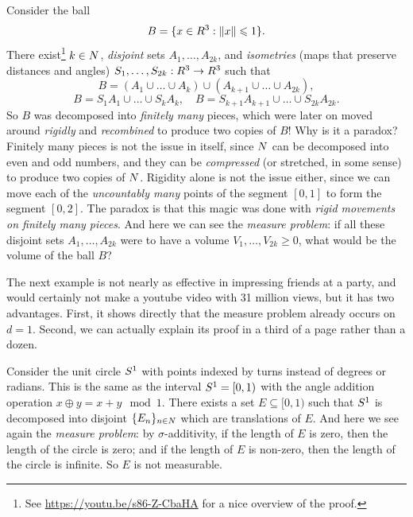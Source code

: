 \documentclass[
]{book}
\theoremstyle{definition}
\theoremstyle{remark}
\newenvironment{example}{\pushQED{\qed}\renewcommand{\qedsymbol}{\scriptsize$\triangle$}\examplex}{\popQED\endexamplex}
\let\mathbb\relax %
\newcommand{\N}{\mathbb{N}}
\newcommand{\R}{\mathbb{R}}
\newcommand{\SSS}{\mathbb{S}}
\renewcommand*{\leq}{\leqslant}
\renewcommand*{\geq}{\geqslant}
\begin{document}
\begin{example}[Banach-Tarski paradox]
\protect\hypertarget{exm:banachtarski}{}\label{exm:banachtarski}Consider the ball \[B = \{x \in \R^3 : \|x\| \leq 1 \} .\] There exist\footnote{See \url{https://youtu.be/s86-Z-CbaHA} for a nice overview of the
  proof.}
\(k\in\N\), \emph{disjoint} sets \(A_1,\dots,A_{2k}\), and \emph{isometries} (maps
that preserve distances and angles) \(S_1,\dots,S_{2k}:\R^3\to\R^3\) such
that
\[B = (A_1 \cup \dots \cup A_k) \cup (A_{k+1} \cup \dots \cup A_{2k}),\]
\[B = S_1 A_1 \cup \dots \cup S_{k} A_{k}, \quad B = S_{k+1} A_{k+1} \cup \dots \cup S_{2k} A_{2k}.\]
So \(B\) was decomposed into \emph{finitely many} pieces, which were later on
moved around \emph{rigidly} and \emph{recombined} to produce two copies of \(B\)!
Why is it a paradox? Finitely many pieces is not the issue in itself,
since \(\N\) can be decomposed into even and odd numbers, and they can be
\emph{compressed} (or stretched, in some sense) to produce two copies of
\(\N\). Rigidity alone is not the issue either, since we can move each of
the \emph{uncountably many} points of the segment \([0,1]\) to form the segment
\([0,2]\). The paradox is that this magic was done with \emph{rigid movements
on finitely many pieces}. And here we can see the \emph{measure problem}: if
all these disjoint sets \(A_1,\dots,A_{2k}\) were to have a volume
\(V_1,\dots,V_{2k} \geq 0\), what would be the volume of the ball \(B\)?
\end{example}

The next example is not nearly as effective in impressing friends at a
party, and would certainly not make a youtube video with 31 million
views, but it has two advantages. First, it shows directly that the
measure problem already occurs on \(d=1\). Second, we can actually explain
its proof in a third of a page rather than a dozen.

\begin{example}[Vitali Set]
\protect\hypertarget{exm:vitali}{}\label{exm:vitali}Consider the unit circle \(\SSS^1\) with points indexed by turns instead of degrees or radians.
This is the same as the interval \(\SSS^1 = [0,1)\) with the angle
addition operation \(x \oplus y = x+y \mod 1\). There exists a set
\(E \subseteq [0,1)\) such that \(\SSS^1\) is decomposed into disjoint
\(\{E_n\}_{n\in\N}\) which are translations of \(E\). And here we see again
the \emph{measure problem}: by \(\sigma\)-additivity, if the length of \(E\) is
zero, then the length of the circle is zero; and if the length of \(E\) is
non-zero, then the length of the circle is infinite. So \(E\) is not
measurable.
\end{example}
\end{document}

